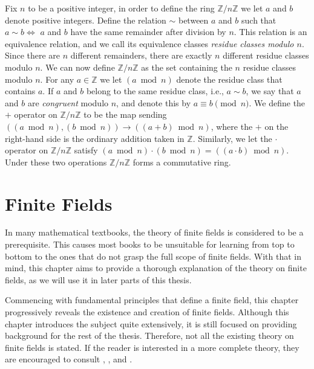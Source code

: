 \documentclass[openany, a4paper, 10pt]{book}
\theoremstyle{plain}
\theoremstyle{plain}
\theoremstyle{plain}
\theoremstyle{definition}
\theoremstyle{plain}
\theoremstyle{definition}
\theoremstyle{remark}
\begin{document}
Fix $n$ to be a positive integer, in order to define the ring $\mathbb Z/n\mathbb Z$ we let $a$ and $b$ denote positive integers.
Define the relation $\sim$ between $a$ and $b$ such that $a \sim b \iff$ $a$ and $b$ have the same remainder after division by $n$.
This relation is an equivalence relation, and we call its equivalence classes \textit{residue classes modulo $n$}.
Since there are $n$ different remainders, there are exactly $n$ different residue classes modulo $n$.
We can now define $\mathbb Z/n\mathbb Z$ as the set containing the $n$ residue classes modulo $n$.
For any $a \in \mathbb Z$ we let $(a \bmod n)$ denote the residue class that contains $a$.
If $a$ and $b$ belong to the same residue class, i.e., $a \sim b$, we say that $a$ and $b$ are \textit{congruent} modulo $n$, and denote this by $a \equiv b \pmod n$.
We define the $+$ operator on $\mathbb Z/n \mathbb Z$ to be the map sending $((a \bmod n), (b \bmod n)) \to ((a+b) \bmod n)$, where the $+$ on the right-hand side is the ordinary addition taken in $\mathbb Z$.
Similarly, we let the $\cdot$ operator on $\mathbb Z/n \mathbb Z$ satisfy $(a \bmod n) \cdot (b \bmod n) = ((a\cdot b) \bmod n)$.
Under these two operations $\mathbb Z/n\mathbb Z$ forms a commutative ring.


\chapter{Finite Fields}\label{chap:finite_fields}
In many mathematical textbooks, the theory of finite fields is considered to be a prerequisite.
This causes most books to be unsuitable for learning from top to bottom to the ones that do not grasp the full scope of finite fields.
With that in mind, this chapter aims to provide a thorough explanation of the theory on finite fields, as we will use it in later parts of this thesis.

Commencing with fundamental principles that define a finite field, this chapter progressively reveals the existence and creation of finite fields.
Although this chapter introduces the subject quite extensively, it is still focused on providing background for the rest of the thesis.
Therefore, not all the existing theory on finite fields is stated.
If the reader is interested in a more complete theory, they are encouraged to consult \cite{huo_ff}, \cite{niederreiter}, and \cite{kochendorffer}.
\end{document}
